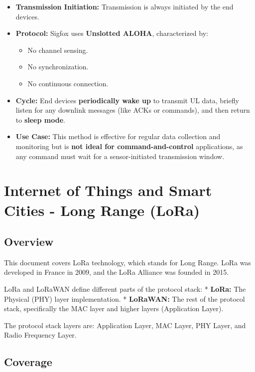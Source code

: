 \documentclass[a4paper, 12pt]{book} %
\begin{document}
\begin{itemize}
\tightlist
\item
  \textbf{Transmission Initiation:} Transmission is always initiated by
  the end devices.
\item
  \textbf{Protocol:} Sigfox uses \textbf{Unslotted ALOHA}, characterized
  by:

  \begin{itemize}
  \tightlist
  \item
    No channel sensing.
  \item
    No synchronization.
  \item
    No continuous connection.
  \end{itemize}
\item
  \textbf{Cycle:} End devices \textbf{periodically wake up} to transmit
  UL data, briefly listen for any downlink messages (like ACKs or
  commands), and then return to \textbf{sleep mode}.
\item
  \textbf{Use Case:} This method is effective for regular data
  collection and monitoring but is \textbf{not ideal for
  command-and-control} applications, as any command must wait for a
  sensor-initiated transmission window.
\end{itemize}


\chapter{Internet of Things and Smart Cities - Long Range
(LoRa)}\label{internet-of-things-and-smart-cities---long-range-lora}

\section{Overview}\label{overview}

This document covers LoRa technology, which stands for Long Range. LoRa
was developed in France in 2009, and the LoRa Alliance was founded in
2015.

LoRa and LoRaWAN define different parts of the protocol stack: *
\textbf{LoRa:} The Physical (PHY) layer implementation. *
\textbf{LoRaWAN:} The rest of the protocol stack, specifically the MAC
layer and higher layers (Application Layer).

The protocol stack layers are: Application Layer, MAC Layer, PHY Layer,
and Radio Frequency Layer.

\section{Coverage}\label{coverage}
\end{document}
